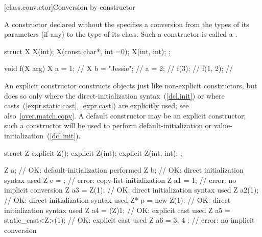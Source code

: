[class.conv.ctor]{Conversion by constructor}%

\pnum
A constructor declared without the
specifies a conversion from
the types of its parameters (if any)
to the type of its class.
Such a constructor is called a
%
.
\begin{example}

%
\begin{codeblock}
struct X {
    X(int);
    X(const char*, int =0);
    X(int, int);
};

void f(X arg) {
  X a = 1;          // 
  X b = "Jessie";   // 
  a = 2;            // 
  f(3);             // 
  f({1, 2});        // 
}
\end{codeblock}
\end{example}

\pnum
\begin{note}
An explicit constructor constructs objects just like non-explicit
constructors, but does so only where the direct-initialization syntax~(\ref{dcl.init}) or where casts~(\ref{expr.static.cast}, \ref{expr.cast}) are explicitly
used; see also~\ref{over.match.copy}.
A default constructor may be an explicit constructor; such a constructor
will be used to perform default-initialization
or value-initialization~(\ref{dcl.init}).
\begin{example}

\begin{codeblock}
struct Z {
  explicit Z();
  explicit Z(int);
  explicit Z(int, int);
};

Z a;                            // OK: default-initialization performed
Z b{};                          // OK: direct initialization syntax used
Z c = {};                       // error: copy-list-initialization
Z a1 = 1;                       // error: no implicit conversion
Z a3 = Z(1);                    // OK: direct initialization syntax used
Z a2(1);                        // OK: direct initialization syntax used
Z* p = new Z(1);                // OK: direct initialization syntax used
Z a4 = (Z)1;                    // OK: explicit cast used
Z a5 = static_cast<Z>(1);       // OK: explicit cast used
Z a6 = { 3, 4 };                // error: no implicit conversion
\end{codeblock}
\end{example}
\end{note}


